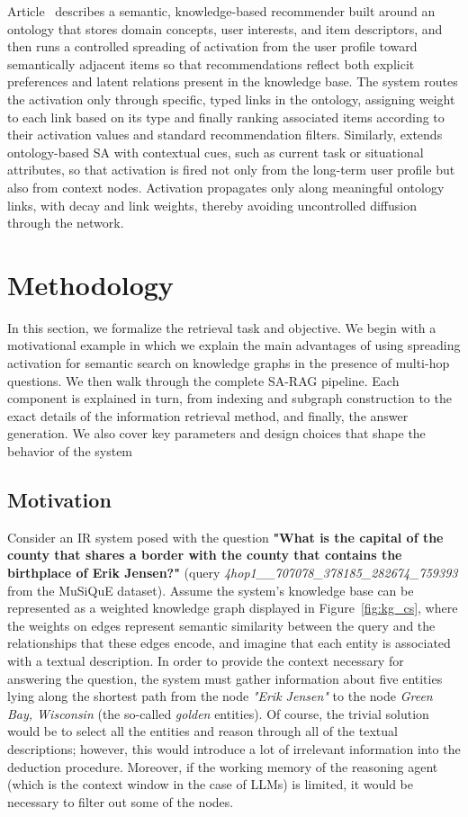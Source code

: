 \documentclass{article}
\begin{document}
Article~\cite{blanco2010adapting} describes a semantic, knowledge-based recommender built around an ontology that stores domain concepts, user interests, and item descriptors, and then runs a controlled spreading of activation from the user profile toward semantically adjacent items so that recommendations reflect both explicit preferences and latent relations present in the knowledge base. The system routes the activation only through specific, typed links in the ontology, assigning weight to each link based on its type and finally ranking associated items according to their activation values and standard recommendation filters. Similarly, \cite{papneja2018context} extends ontology-based SA with contextual cues, such as current task or situational attributes, so that activation is fired not only from the long-term user profile but also from context nodes. Activation propagates only along meaningful ontology links, with decay and link weights, thereby avoiding uncontrolled diffusion through the network.

\section{Methodology}
In this section, we formalize the retrieval task and objective. We begin with a motivational example in which we explain the main advantages of using spreading activation for semantic search on knowledge graphs in the presence of multi-hop questions. We then walk through the complete SA-RAG pipeline. Each component is explained in turn, from indexing and subgraph construction to the exact details of the information retrieval method, and finally, the answer generation. We also cover key parameters and design choices that shape the behavior of the system

\subsection{Motivation}
Consider an IR system posed with the question \textbf{"What is the capital of the county that shares a border with the county that contains the birthplace of Erik Jensen?"} (query \textit{4hop1\_\_707078\_378185\_282674\_759393} from the MuSiQuE dataset). Assume the system's knowledge base can be represented as a weighted knowledge graph displayed in Figure~\ref{fig:kg_cs}, where the weights on edges represent semantic similarity between the query and the relationships that these edges encode, and imagine that each entity is associated with a textual description. In order to provide the context necessary for answering the question, the system must gather information about five entities lying along the shortest path from the node \textit{"Erik Jensen"} to the node \textit{Green Bay, Wisconsin} (the so-called \textit{golden} entities). Of course, the trivial solution would be to select all the entities and reason through all of the textual descriptions; however, this would introduce a lot of irrelevant information into the deduction procedure. Moreover, if the working memory of the reasoning agent (which is the context window in the case of LLMs) is limited, it would be necessary to filter out some of the nodes.
\end{document}
